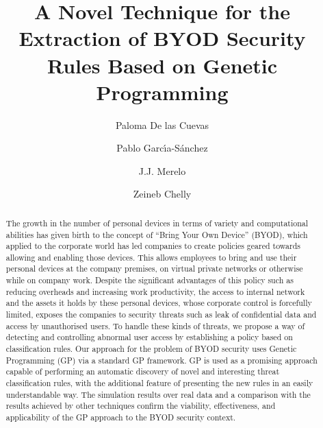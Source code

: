 \documentclass[a4paper,10pt,twocolumn,preprint,3p]{elsarticle}
\begin{document}
\begin{frontmatter}

\title{A Novel Technique for the Extraction of BYOD Security Rules Based on Genetic Programming}

\author[ugr]{Paloma De las Cuevas}
\author[uca]{Pablo Garc\'{\i}a-S\'anchez}
\author[ugr]{J.J. Merelo}
\author[isgt]{Zeineb Chelly}

\address[ugr]{Department of Computer Architecture and Computer Technology, ETSIIT and CITIC \\
University of Granada, Granada, Spain. Tel: +34958241778. Fax: +34958248993}
\address[uca]{Department of Computer Engineering, School of Engineering \\
University of C\'adiz, Spain.}
\address[isgt]{LARODEC, Institut Sup\'erieur de Gestion de Tunis, Tunisia.}


\begin{abstract}
The growth in the number of personal devices in terms of variety and
computational %
abilities has given birth to the concept of ``Bring Your Own Device''
(BYOD), which applied to the corporate world has led companies to
create policies geared towards allowing and enabling those devices. %
This allows %
employees to bring and use their personal devices at
the company premises, on virtual private networks or otherwise while
on company work. Despite the significant advantages of this policy
such as reducing overheads and increasing work productivity, 
the
access to internal network and the assets it holds by these personal
devices, whose corporate control is forcefully limited, exposes the companies to
security threats such as leak of confidential data and access by
unauthorised users. %
To handle these kinds of threats, we propose a way of detecting and controlling abnormal user
access by establishing a policy based on classification rules. Our
approach for the problem of BYOD security uses Genetic Programming
(GP) via a standard GP framework. GP is used as a promising approach %
capable of performing an automatic discovery of novel and interesting
threat classification rules, with the additional feature of presenting
the new rules in an easily understandable way. %
The simulation results over real data and a
comparison with the results achieved by other techniques confirm the
viability, effectiveness, and applicability of the GP approach to the
BYOD security context.
\end{abstract}



\end{frontmatter}
\end{document}
